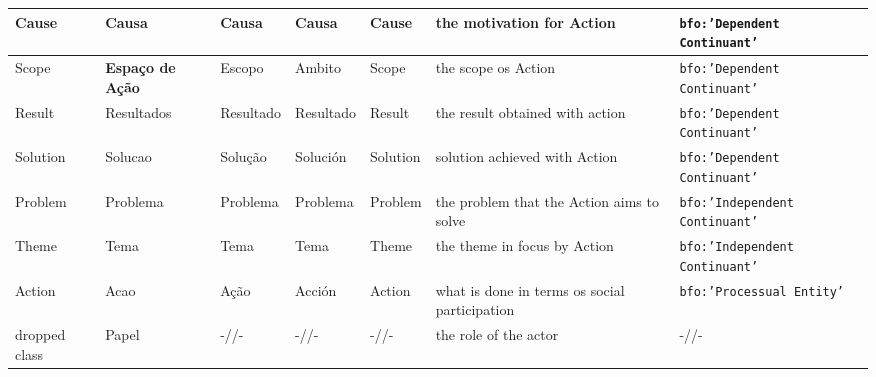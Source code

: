 \documentclass[10pt,letterpaper]{article}
\begin{document}
\begin{table}[!h]
\begin{adjustwidth}{-2.25in}{0in}
\begin{tabular}{|p{1.8cm}|p{1.6cm}||p{2.2cm}|p{2.2cm}|p{1.8cm}||p{4cm}||p{3cm}|}
Cause & Causa & Causa & Causa &  Cause & the motivation for Action & {\tt bfo:'Dependent Continuant'} \\\hline
      Scope &{\bf Espa\c{c}o de A\c{c}\~ao} & Escopo & Ambito & Scope & the scope os Action & {\tt bfo:'Dependent Continuant'} \\\hline
Result & Resultados & Resultado & Resultado & Result & the result obtained with action & {\tt bfo:'Dependent Continuant'} \\\hline
      Solution & Solucao & Solu\c{c}\~ao & Soluci\'on & Solution & solution achieved with Action & {\tt bfo:'Dependent Continuant'} \\\hline \hline
      Problem & Problema & Problema & Problema & Problem & the problem that the Action aims to solve & {\tt bfo:'Independent Continuant'} \\\hline
Theme & Tema & Tema & Tema & Theme & the theme in focus by Action & {\tt bfo:'Independent Continuant'} \\\hline \hline
Action & Acao & A\c{c}\~ao & Acci\'on & Action & what is done in terms os social participation & {\tt bfo:'Processual Entity'} \\\hline\hline
      {\color{red} dropped class}& Papel & -//-  & -//- & -//- & the role of the actor & -//- \\ \hline
  \end{tabular}
  \label{ospClasses}
\end{adjustwidth}
\end{table}
\end{document}

